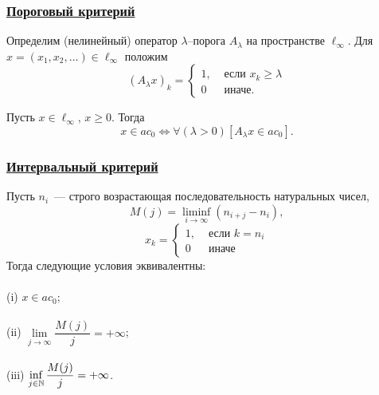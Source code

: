 \begin{frame}\frametitle{\underline{Пороговый критерий}}
	\label{page:space_ac0}
	Определим (нелинейный) оператор $\lambda$--порога $A_\lambda$ на пространстве $\ell_\infty$.
	Для $x = (x_1, x_2, ...) \in \ell_\infty$ положим
	\begin{equation}
		(A_\lambda x)_k = \begin{cases}
			1, & \mbox{~если~} x_k \geq \lambda
			\\
			0  & \mbox{~иначе.~}
		\end{cases}
	\end{equation}

	\vfill

	\begin{ttheorem}
		Пусть $x\in\ell_\infty$, $x\geq 0$.
		Тогда
		\begin{equation}
			x\in ac_0 \Leftrightarrow
			\forall(\lambda>0)[A_\lambda x \in ac_0]
			.
		\end{equation}
	\end{ttheorem}
\end{frame}




\begin{frame}\frametitle{\underline{Интервальный критерий}}
		\label{thm:M_j_ac0_inf_lim}
		Пусть $n_i$~--- строго возрастающая последовательность натуральных чисел,
		\begin{equation}
			\label{eq:definition_M_j}
			M(j) = \liminf_{i\to\infty} \left(n_{i+j} - n_i\right),
		\end{equation}
		\begin{equation}
			x_k = \left\{\begin{array}{ll}
				1, & \mbox{~если~} k = n_i
				\\
				0  & \mbox{~иначе~}
			\end{array}\right.
		\end{equation}
		Тогда следующие условия эквивалентны:
		\\~\\
		(i)   $x \in ac_0$;
		\\~\\
		(ii)  $\lim\limits_{j \to \infty} \dfrac{M(j)}{j} = +\infty$;
		\\~\\
		(iii) $\inf\limits_{j \in \mathbb{N}}     \dfrac{M(j)}{j} = +\infty$.
\end{frame}


